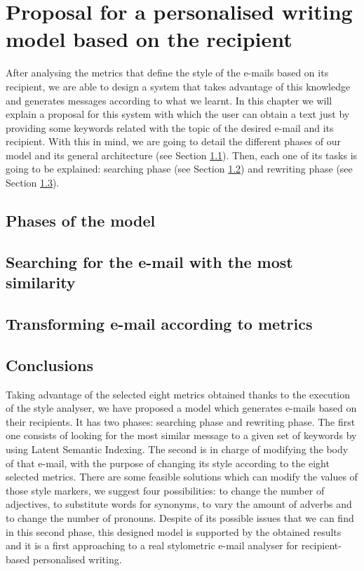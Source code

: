 \chapter{Proposal for a personalised writing model based on the recipient}\label{cap:proposal}


After analysing the metrics that define the style of the e-mails based on its recipient, we are able to design a system that takes advantage of this knowledge and generates messages according to what we learnt. In this chapter we will explain a proposal for this system with which the user can obtain a text just by providing some keywords related with the topic of the desired e-mail and its recipient. With this in mind, we are going to detail the different phases of our model and its general architecture (see Section \ref{sect:phasemod}). Then, each one of its tasks is going to be explained: searching phase (see Section \ref{sect:searchemail}) and rewriting phase (see Section \ref{sect:transemail}).

\section{Phases of the model}\label{sect:phasemod}


\section{Searching for the e-mail with the most similarity}\label{sect:searchemail}


\section{Transforming e-mail according to metrics}\label{sect:transemail}


\section{Conclusions}
Taking advantage of the selected eight metrics obtained thanks to the execution of the style analyser, we have proposed a model which generates e-mails based on their recipients. It has two phases: searching phase and rewriting phase. The first one consists of looking for the most similar message to a given set of keywords by using Latent Semantic Indexing. The second is in charge of modifying the body of that e-mail, with the purpose of changing its style according to the eight selected metrics. There are some feasible solutions which can modify the values of those style markers, we suggest four possibilities: to change the number of adjectives, to substitute words for synonyms, to vary the amount of adverbs and to change the number of pronouns. Despite of its possible issues that we can find in this second phase, this designed model is supported by the obtained results and it is a first approaching to a real stylometric e-mail analyser for recipient-based personalised writing.